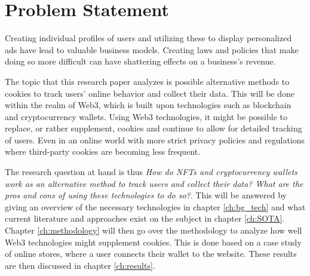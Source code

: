 \chapter{Problem Statement}
\label{ch:problem}

Creating individual profiles of users and utilizing these to display personalized ads have lead to valuable business models. Creating laws and policies that make doing so more difficult can have shattering effects on a business's revenue.

The topic that this research paper analyzes is possible alternative methods to cookies to track users' online behavior and collect their data. This will be done within the realm of Web3, which is built upon technologies such as blockchain and cryptocurrency wallets. Using Web3 technologies, it might be possible to replace, or rather supplement, cookies and continue to allow for detailed tracking of users. Even in an online world with more strict privacy policies and regulations where third-party cookies are becoming less frequent.

The research question at hand is thus \textit{How do NFTs and cryptocurrency wallets work as an alternative method to track users and collect their data? What are the pros and cons of using these technologies to do so?}. This will be answered by giving an overview of the necessary technologies in chapter \ref{ch:bg_tech} and what current literature and approaches exist on the subject in chapter \ref{ch:SOTA}. Chapter \ref{ch:methodology} will then go over the methodology to analyze how well Web3 technologies might supplement cookies. This is done based on a case study of online stores, where a user connects their wallet to the website. These results are then discussed in chapter \ref{ch:results}.